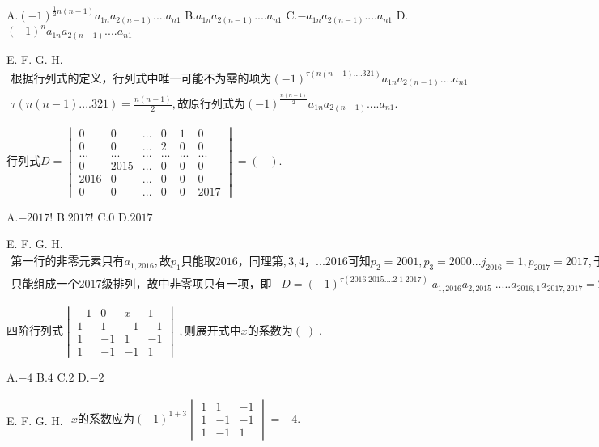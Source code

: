 A.$(-1)^{{\textstyle\frac12}n(n-1)}a_{1n}a_{2(n-1)}....a_{n1}$   B.$a_{1n}a_{2(n-1)}....a_{n1}$   C.$-a_{1n}a_{2(n-1)}....a_{n1}$   D.$(-1)^na_{1n}a_{2(n-1)}....a_{n1}$

E.   F.   G.   H.
$\begin{array}{l}\mathrm{根据行列式的定义}，\mathrm{行列式中唯一可能不为零的项为}(-1)^{\tau(n(n-1)....321)}a_{1n}a_{2(n-1)}....a_{n1}\\\tau(n(n-1)....321)=\frac{n(n-1)}2,\mathrm{故原行列式为}(-1)^\frac{n(n-1)}2a_{1n}a_{2(n-1)}....a_{n1}.\end{array}$


$\mathrm{行列式}D=\begin{vmatrix}0&0&...&0&1&0\\0&0&...&2&0&0\\...&...&...&...&...&...\\0&2015&...&0&0&0\\2016&0&...&0&0&0\\0&0&...&0&0&2017\end{vmatrix}=(\;\;\;).$

A.$-2017!$   B.$2017!$   C.$0$   D.$2017$

E.   F.   G.   H.
$\begin{array}{l}\mathrm{第一行的非零元素只有}a_{1,2016},故p_1\mathrm{只能取}2016，\mathrm{同理第},3,4，...2016\mathrm{可知}p_2=2001,p_3=2000...j_{2016}=1,p_{2017}=2017,\mathrm{于是在可能取的数码中}，\\\mathrm{只能组成一个}2017\mathrm{级排列}，\mathrm{故中非零项只有一项}，即\;\;\;D=(-1)^{\tau(2016\;2015....2\;1\;2017)}\;a_{1,2016}a_{2,2015}\;.....a_{2016,1}a_{2017,2017}=2017!\;.\;\;\;\;\;\end{array}$


$\mathrm{四阶行列式}\begin{vmatrix}-1&0&x&1\\1&1&-1&-1\\1&-1&1&-1\\1&-1&-1&1\end{vmatrix}\;,\mathrm{则展开式中}x\mathrm{的系数为}(\;)\;.$

A.$-4$   B.$4$   C.$2$   D.$-2$

E.   F.   G.   H.
$\begin{array}{l}x\mathrm{的系数应为}(-1)^{1+3}\begin{vmatrix}1&1&-1\\1&-1&-1\\1&-1&1\end{vmatrix}=-4.\\\end{array}$


